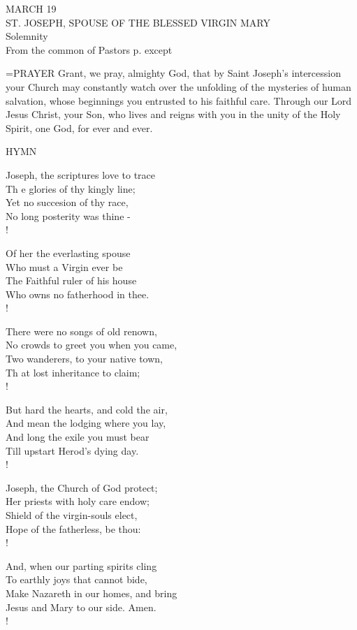\begin{center}\normalsize MARCH 19\\
\footnotesize ST. JOSEPH, SPOUSE OF THE BLESSED VIRGIN MARY \\
\footnotesize Solemnity\\
\footnotesize From the common of Pastors p.    except \\
\end{center}

\hangindent=\parindent \small{PRAYER 
Grant, we pray, almighty God,
that by Saint Joseph’s intercession
your Church may constantly watch over
the unfolding of the mysteries of human salvation,
whose beginnings you entrusted to his faithful care.
Through our Lord Jesus Christ, your Son,
who lives and reigns with you in the unity of the Holy Spirit,
one God, for ever and ever.\\}
 
\noindent\small{\uppercase{Hymn}}\normalsize\label{proper:josephSpouse:hymn}
\begin{cverse}
Joseph, the scriptures love to trace\\
Th e glories of thy kingly line;\\
Yet no succesion of thy race,\\
No long posterity was thine -\\!

Of her the everlasting spouse\\
Who must a Virgin ever be\\
The Faithful ruler of his house\\
Who owns no fatherhood in thee.\\!

There were no songs of old renown,\\
No crowds to greet you when you came,\\
Two wanderers, to your native town,\\
Th at lost inheritance to claim;\\!

But hard the hearts, and cold the air,\\
And mean the lodging where you lay,\\
And long the exile you must bear\\
Till upstart Herod’s dying day.\\!

Joseph, the Church of God protect;\\
Her priests with holy care endow;\\
Shield of the virgin-souls elect,\\
Hope of the fatherless, be thou:\\!

And, when our parting spirits cling\\
To earthly joys that cannot bide,\\
Make Nazareth in our homes, and bring\\
Jesus and Mary to our side. Amen.\\!
\end{cverse}

